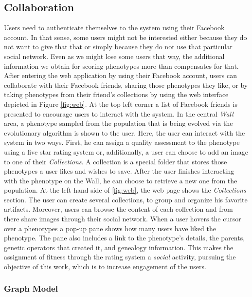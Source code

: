 \subsection{Collaboration}
\label{sec:col}
Users need to authenticate themselves to the system using their
Facebook account. In that sense, some users might not be interested
either because they do not want to give that that or simply because
they do not use that particular social network. Even as we might lose
some users that way, the additional information we obtain for scoring
phenotypes more than compensates for that. %
After entering the web application by using their Facebook account,
users can collaborate with their Facebook friends, 
sharing those phenotypes they like, or by taking phenotypes
from their friend's collections by using the web interface depicted 
in Figure \ref{fig:web}.
At the top left corner a list of Facebook friends is presented
to encourage users to interact with the system. In the central 
\emph{ Wall } area, a phenotype sampled from the population that is
being evolved via the evolutionary algorithm 
is shown to the user.
Here, the user can interact with the system in two ways.
First, he can assign a quality assessment %
 to the phenotype using
a five star rating system or,
additionally, a user can choose to add an image to one of their \emph{Collections}.
A collection is a special folder that stores those phenotypes a user likes and wishes
to save. After the user finishes interacting with the phenotype
on the Wall, he can choose to retrieve a new one from the population.
At the left hand side of \ref{fig:web}, the web page shows the \emph{Collections} section.
The user can create several collections, to group and organize his favorite 
artifacts. Moreover, users can browse the content of each collection and from
there share images through their social network.
When a user hovers the cursor over a phenotypes a pop-up pane shows how many users have
liked the phenotype. The pane also includes a link to the phenotype's 
details, the parents, genetic operators that created it, and genealogy
information. This makes the assignment of fitness through the rating
system a {\em social} activity, pursuing the objective of this work,
which is to increase engagement of the users.
\subsubsection{Graph Model} 

